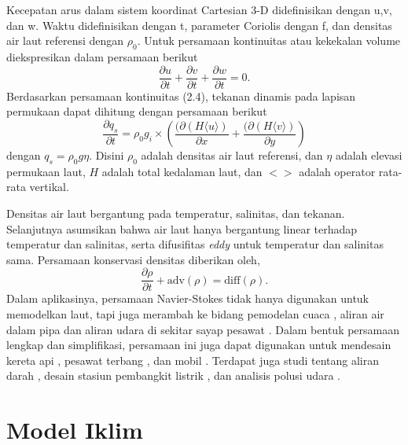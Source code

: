\begin{spacing}{1.5}
	\par Kecepatan arus dalam sistem koordinat Cartesian 3-D didefinisikan dengan u,v, dan w. Waktu didefinisikan dengan t, parameter Coriolis dengan f, dan densitas air laut referensi dengan $\rho_0$.
	Untuk persamaan kontinuitas atau kekekalan volume diekspresikan dalam persamaan berikut
	\begin{equation}
		\frac{\partial u}{\partial t} + \frac{\partial v}{\partial t} + \frac{\partial w}{\partial t} = 0.
	\end{equation}
	Berdasarkan persamaan kontinuitas (2.4), tekanan dinamis pada lapisan permukaan dapat dihitung dengan persamaan berikut
	\begin{equation}
		\frac{\partial q_s}{\partial t} = \rho_0 g_i \times \left( \frac{(\partial \left(H \langle u \rangle \right)} {\partial x} + \frac{(\partial \left(H \langle v \rangle \right)} {\partial y}\right)
	\end{equation}
	dengan $q_s = \rho_0 g \eta$. Disini $\rho_0$ adalah densitas air laut referensi, dan $\eta$ adalah elevasi permukaan laut, $H$ adalah total kedalaman laut, dan $< >$ adalah operator rata-rata vertikal.
	\par Densitas air laut bergantung pada temperatur, salinitas, dan tekanan. Selanjutnya asumsikan bahwa air laut hanya bergantung linear terhadap temperatur dan salinitas, serta difusifitas \textit{eddy} untuk temperatur dan salinitas sama. Persamaan konservasi densitas diberikan oleh,
	\begin{equation}
		\frac{\partial \rho}{\partial t} + \text{adv}(\rho) = \text{diff}(\rho).
	\end{equation}
	Dalam aplikasinya, persamaan Navier-Stokes tidak hanya digunakan untuk memodelkan laut, tapi juga merambah ke bidang pemodelan cuaca , aliran air dalam pipa  dan aliran udara di sekitar sayap pesawat . Dalam bentuk persamaan lengkap dan simplifikasi, persamaan ini juga dapat digunakan untuk mendesain kereta api , pesawat terbang , dan mobil . Terdapat juga studi tentang aliran darah , desain stasiun pembangkit listrik , dan analisis polusi udara . 
\end{spacing}
\vspace{-0.1pc}
\section[Model Iklim]{Model Iklim}
\begin{spacing}{1.5}
\end{spacing}
	
